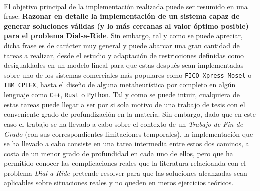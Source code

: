 \documentclass{subfiles}
\begin{document}
        \paragraph{}
        El objetivo principal de la implementación realizada puede ser resumido en una frase: \textbf{Razonar en detalle la implementación de un sistema capaz de generar soluciones válidas (y lo más cercanas al valor óptimo posible) para el problema Dial-a-Ride}. Sin embargo, tal y como se puede apreciar, dicha frase es de carácter muy general y puede abarcar una gran cantidad de tareas a realizar, desde el estudio y adaptación de restricciones definidas como desigualdades en un modelo lineal para que estas después sean implementadas sobre uno de los sistemas comerciales más populares como \texttt{FICO Xpress Mosel} o \texttt{IBM CPLEX}, hasta el diseño de alguna metaheurística por completo en algún lenguaje como \texttt{C++}, \texttt{Rust} o \texttt{Python}. Tal y como se puede intuir, cualquiera de estas tareas puede llegar a ser por si sola motivo de una trabajo de tesis con el conveniente grado de profundización en la materia. Sin embargo, dado que en este caso el trabajo se ha llevado a cabo sobre el contexto de un \emph{Trabajo de Fin de Grado} (con sus correspondientes limitaciones temporales), la implementación que se ha llevado a cabo consiste en una tarea intermedia entre estos dos caminos, a costa de un menor grado de profundidad en cada uno de ellos, pero que ha permitido conocer las complicaciones reales que la literatura relacioanda con el problema \emph{Dial-a-Ride} pretende resolver para que las soluciones alcanzadas sean aplicables sobre situaciones reales y no queden en meros ejercicios teóricos.
\end{document}
